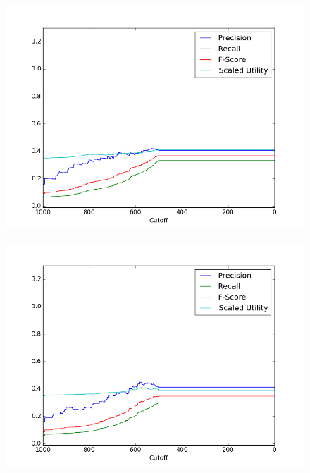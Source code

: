 \documentclass{article}
\begin{document}
{{\begin{figure}[h!]
\begin{minipage}{.25\textwidth}
  \label{fig:basic_multi}
\end{minipage}
\begin{minipage}{.25\textwidth}
  \centering
  \includegraphics[width=1\linewidth]{fig/official/f_emb_comb.png}
  \label{fig:emb_comb}
\end{minipage}%
\begin{minipage}{.25\textwidth}
  \centering
  \includegraphics[width=1\linewidth]{fig/official/f_emb_pos.png}
  \label{fig:emb_pos}
\end{minipage}
\begin{minipage}{.25\textwidth}
  \centering

\end{minipage}
\end{figure}}}
\end{document}

